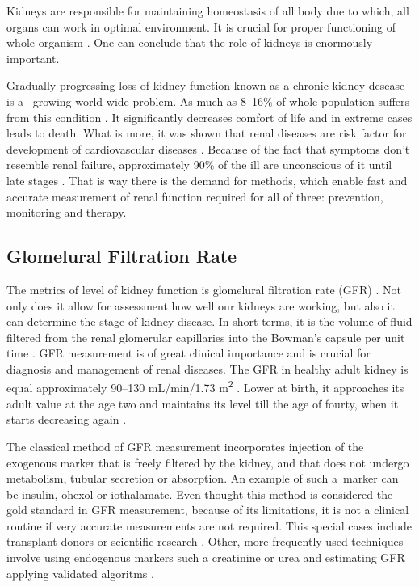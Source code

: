 Kidneys are responsible for maintaining homeostasis of all body due to which, all organs can work in optimal environment.
It is crucial for proper functioning of whole organism \cite{mosby}. One can conclude that the role of kidneys is enormously important. 

Gradually progressing loss of kidney function known as a chronic kidney desease is a~ growing world-wide problem. As much as 8--16\% of whole population suffers from this condition \cite{statistics}. It significantly decreases comfort of life and in extreme cases leads to death. What is more, it was shown that renal diseases are risk factor for development of cardiovascular diseases \cite{cardiovascular_diseases}.
Because of the fact that symptoms don't resemble renal failure, approximately 90\% of the ill are unconscious of it until late stages \cite{national_kidney_foundation}. That is way there is the demand for methods, which enable fast and accurate measurement of renal function required for all of three: prevention, monitoring and therapy.   

\subsection{Glomelural Filtration Rate}
The metrics of level of kidney function is glomelural filtration rate (GFR) \cite{traynor2006measure}. Not only does it allow for assessment how well our kidneys are working, but also it can determine the stage of kidney disease. In short terms, it is the volume of fluid filtered from the renal glomerular capillaries into the Bowman's capsule per unit time \cite{gfr_dictionary}. %
GFR measurement is of great clinical importance and is crucial for diagnosis and management of renal diseases.
The GFR in healthy adult kidney is equal approximately 90--130 mL/min/1.73 m\textsuperscript{2} \cite{normal_values}. Lower at birth, it approaches its adult value at the age two and maintains its level till the age of fourty, when it starts decreasing again \cite{weinstein2010aging}.     

The classical method of GFR measurement incorporates injection of the exogenous marker that is freely filtered by the kidney, and that does not undergo metabolism, tubular secretion or absorption. An example of such a~marker can be insulin, ohexol or iothalamate. 
Even thought this method is considered the gold standard in GFR measurement, because of its limitations, it is not a clinical routine if very accurate measurements are not required. This special cases include transplant donors or scientific research \cite{traynor2006measure}. 
Other, more frequently used techniques involve using endogenous markers such a creatinine or urea and estimating GFR applying validated algoritms \cite{delanaye2012measuring}.

